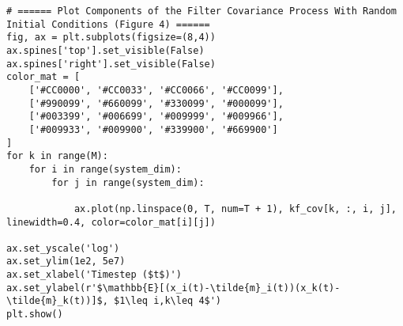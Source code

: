 \documentclass[10pt]{article}
\newcommand{\1}[1]{\mathbbm{1}_{#1}}
\begin{document}
    \begin{verbatim}
# ====== Plot Components of the Filter Covariance Process With Random Initial Conditions (Figure 4) ======
fig, ax = plt.subplots(figsize=(8,4))
ax.spines['top'].set_visible(False)
ax.spines['right'].set_visible(False)
color_mat = [
    ['#CC0000', '#CC0033', '#CC0066', '#CC0099'],
    ['#990099', '#660099', '#330099', '#000099'],
    ['#003399', '#006699', '#009999', '#009966'],
    ['#009933', '#009900', '#339900', '#669900']
]
for k in range(M):
    for i in range(system_dim):
        for j in range(system_dim):

            ax.plot(np.linspace(0, T, num=T + 1), kf_cov[k, :, i, j], linewidth=0.4, color=color_mat[i][j])

ax.set_yscale('log')
ax.set_ylim(1e2, 5e7)
ax.set_xlabel('Timestep ($t$)')
ax.set_ylabel(r'$\mathbb{E}[(x_i(t)-\tilde{m}_i(t))(x_k(t)-\tilde{m}_k(t))]$, $1\leq i,k\leq 4$')
plt.show()
        
    \end{verbatim}
\end{document}
